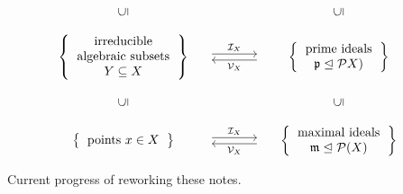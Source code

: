\begin{theorem}
\begin{enumerate}
\[\begin{matrix}
          \\
            {}
          & {}
          & {}
          \\
            \rotatebox[origin=c]{90}{$\subseteq$}
          & {}
          & \rotatebox[origin=c]{90}{$\subseteq$}
          \\
            {}
          & {}
          & {}
          \\
            \left\{
              \begin{tabular}{c}
                  irreducible \\
                  algebraic subsets \\
                  $Y \subseteq X$
              \end{tabular}
            \right\}
          & \begin{tikzcd}[column sep = large]
                {}
                \arrow[shift left]{r}{\mc{I}_X}
              & {}
                \arrow[shift left]{l}{\mc{V}_X}
            \end{tikzcd}
          & \left\{
              \begin{tabular}{c}
                prime ideals \\
                $\mf{p} \idealeq \mc{P}X)$
              \end{tabular}
            \right\}
          \\
            {}
          & {}
          & {}
          \\
            \rotatebox[origin=c]{90}{$\subseteq$}
          & {}
          & \rotatebox[origin=c]{90}{$\subseteq$}
          \\
            {}
          & {}
          & {}
          \\
            \left\{
              \begin{tabular}{c}
                points $x \in X$
              \end{tabular}
            \right\}
          & \begin{tikzcd}[column sep = large]
                {}
                \arrow[shift left]{r}{\mc{I}_X}
              & {}
                \arrow[shift left]{l}{\mc{V}_X}
            \end{tikzcd}
          & \left\{
              \begin{tabular}{c}
                maximal ideals \\
                $\mf{m} \idealeq \mc{P}(X)$
              \end{tabular}
            \right\}
        \end{matrix}
      \]
  \end{enumerate}
\end{theorem}








\noindent\hrulefill \, Current progress of reworking these notes. \hrulefill




